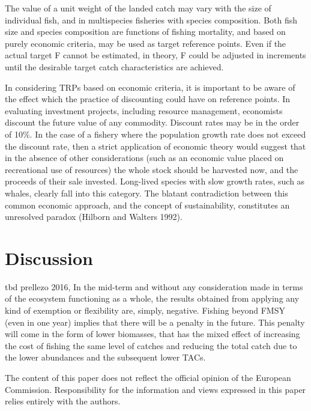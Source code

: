 \documentclass[12pt,oneline,a4paper,numbib]{ouparticle}
\begin{document}
The value of a unit weight of the landed catch may vary with the size of individual fish, and in multispecies fisheries with species composition. Both fish size and species composition are functions of fishing mortality, and based on purely economic criteria, may be used as target reference points. Even if the actual target F cannot be estimated, in theory, F could be adjusted in increments until the desirable target catch characteristics are achieved.

In considering TRPs based on economic criteria, it is important to be aware of the effect which the practice of discounting could have on reference points. In evaluating investment projects, including resource management, economists discount the future value of any commodity. Discount rates may be in the order of 10\%. In the case of a fishery where the population growth rate does not exceed the discount rate, then a strict application of economic theory would suggest that in the absence of other considerations (such as an economic value placed on recreational use of resources) the whole stock should be harvested now, and the proceeds of their sale invested. Long-lived species with slow growth rates, such as whales, clearly fall into this category. The blatant contradiction between this common economic approach, and the concept of sustainability, constitutes an unresolved paradox (Hilborn and Walters 1992).


\section{Discussion}
\label{sec4}
tbd
prellezo 2016, In the mid-term and without any consideration made in terms of the ecosystem functioning as a whole, the results obtained from applying any kind of exemption or flexibility are, simply, negative. Fishing beyond FMSY (even in one year) implies that there will be a penalty in the future. This penalty will come in the form of lower biomasses, that has the mixed effect of increasing the cost of fishing the same level of catches and reducing the total catch due to the lower abundances and the subsequent lower TACs.

\begin{notes}[Acknowledgements]
The content of this paper does not reflect the official opinion of the European Commission. Responsibility for the information and views expressed in this paper relies entirely with the authors.
\end{notes}



\end{document}
